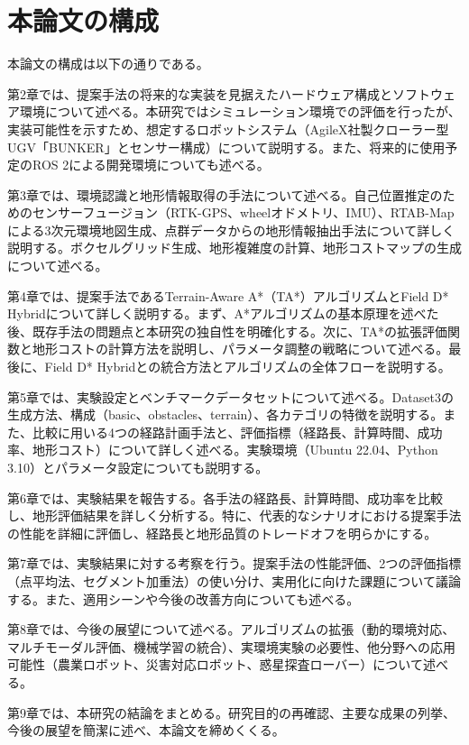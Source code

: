 \section{本論文の構成}

本論文の構成は以下の通りである。

第2章では、提案手法の将来的な実装を見据えたハードウェア構成とソフトウェア環境について述べる。本研究ではシミュレーション環境での評価を行ったが、実装可能性を示すため、想定するロボットシステム（AgileX社製クローラー型UGV「BUNKER」とセンサー構成）について説明する。また、将来的に使用予定のROS 2による開発環境についても述べる。

第3章では、環境認識と地形情報取得の手法について述べる。自己位置推定のためのセンサーフュージョン（RTK-GPS、wheelオドメトリ、IMU）、RTAB-Mapによる3次元環境地図生成、点群データからの地形情報抽出手法について詳しく説明する。ボクセルグリッド生成、地形複雑度の計算、地形コストマップの生成について述べる。

第4章では、提案手法であるTerrain-Aware A*（TA*）アルゴリズムとField D* Hybridについて詳しく説明する。まず、A*アルゴリズムの基本原理を述べた後、既存手法の問題点と本研究の独自性を明確化する。次に、TA*の拡張評価関数と地形コストの計算方法を説明し、パラメータ調整の戦略について述べる。最後に、Field D* Hybridとの統合方法とアルゴリズムの全体フローを説明する。

第5章では、実験設定とベンチマークデータセットについて述べる。Dataset3の生成方法、構成（basic、obstacles、terrain）、各カテゴリの特徴を説明する。また、比較に用いる4つの経路計画手法と、評価指標（経路長、計算時間、成功率、地形コスト）について詳しく述べる。実験環境（Ubuntu 22.04、Python 3.10）とパラメータ設定についても説明する。

第6章では、実験結果を報告する。各手法の経路長、計算時間、成功率を比較し、地形評価結果を詳しく分析する。特に、代表的なシナリオにおける提案手法の性能を詳細に評価し、経路長と地形品質のトレードオフを明らかにする。

第7章では、実験結果に対する考察を行う。提案手法の性能評価、2つの評価指標（点平均法、セグメント加重法）の使い分け、実用化に向けた課題について議論する。また、適用シーンや今後の改善方向についても述べる。

第8章では、今後の展望について述べる。アルゴリズムの拡張（動的環境対応、マルチモーダル評価、機械学習の統合）、実環境実験の必要性、他分野への応用可能性（農業ロボット、災害対応ロボット、惑星探査ローバー）について述べる。

第9章では、本研究の結論をまとめる。研究目的の再確認、主要な成果の列挙、今後の展望を簡潔に述べ、本論文を締めくくる。
